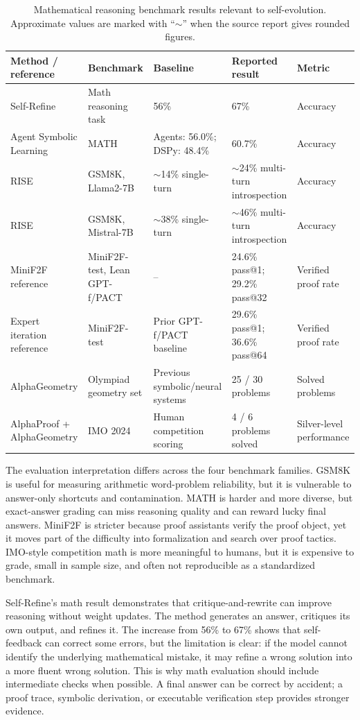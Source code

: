 \begin{table}[t]
\centering
\TableTight
\caption{Mathematical reasoning benchmark results relevant to self-evolution. Approximate values are marked with ``$\sim$'' when the source report gives rounded figures.}
\label{tab:math-exact-scores}
\begin{tabularx}{\textwidth}{@{}L{0.17\textwidth}L{0.17\textwidth}L{0.20\textwidth}L{0.22\textwidth}Y@{}}
\toprule
\textbf{Method / reference} & \textbf{Benchmark} & \textbf{Baseline} & \textbf{Reported result} & \textbf{Metric} \\
\midrule
Self-Refine & Math reasoning task & 56\% & 67\% & Accuracy \\
Agent Symbolic Learning & MATH & Agents: 56.0\%; DSPy: 48.4\% & 60.7\% & Accuracy \\
RISE & GSM8K, Llama2-7B & $\sim$14\% single-turn & $\sim$24\% multi-turn introspection & Accuracy \\
RISE & GSM8K, Mistral-7B & $\sim$38\% single-turn & $\sim$46\% multi-turn introspection & Accuracy \\
MiniF2F reference & MiniF2F-test, Lean GPT-f/PACT & -- & 24.6\% pass@1; 29.2\% pass@32 & Verified proof rate \\
Expert iteration reference & MiniF2F-test & Prior GPT-f/PACT baseline & 29.6\% pass@1; 36.6\% pass@64 & Verified proof rate \\
AlphaGeometry & Olympiad geometry set & Previous symbolic/neural systems & 25 / 30 problems & Solved problems \\
AlphaProof + AlphaGeometry & IMO 2024 & Human competition scoring & 4 / 6 problems solved & Silver-level performance \\
\bottomrule
\end{tabularx}
\end{table}

The evaluation interpretation differs across the four benchmark families. GSM8K is useful for measuring arithmetic word-problem reliability, but it is vulnerable to answer-only shortcuts and contamination. MATH is harder and more diverse, but exact-answer grading can miss reasoning quality and can reward lucky final answers. MiniF2F is stricter because proof assistants verify the proof object, yet it moves part of the difficulty into formalization and search over proof tactics. IMO-style competition math is more meaningful to humans, but it is expensive to grade, small in sample size, and often not reproducible as a standardized benchmark.

Self-Refine's math result demonstrates that critique-and-rewrite can improve reasoning without weight updates. The method generates an answer, critiques its own output, and refines it. The increase from 56\% to 67\% shows that self-feedback can correct some errors, but the limitation is clear: if the model cannot identify the underlying mathematical mistake, it may refine a wrong solution into a more fluent wrong solution. This is why math evaluation should include intermediate checks when possible. A final answer can be correct by accident; a proof trace, symbolic derivation, or executable verification step provides stronger evidence.

